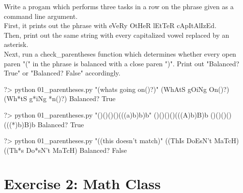 \documentclass{42-en}
\begin{document}
Write a progam which performs three tasks in a row on the phrase given as a command line argument.\\

First, it prints out the phrase with eVeRy OtHeR lEtTeR cApItAlIzEd.\\

Then, print out the same string with every capitalized vowel replaced by an asterisk.\\

Next, run a check\_parentheses function which determines whether every open paren "(" in the phrase is balanced with a close paren ")". Print out "Balanced? True" or "Balanced? False" accordingly.


\begin{42console}
	?> python 01_parentheses.py "(whats going on()?)"
	(WhAtS gOiNg On()?)
	(Wh*tS g*iNg *n()?)
	Balanced? True
\end{42console}

\begin{42console}
	?> python 01_parentheses.py "()()()()(((a)b)b)b"
	()()()()(((A)b)B)b
	()()()()(((*)b)B)b
	Balanced? True
\end{42console}

\begin{42console}
	?> python 01_parentheses.py "((this doesn't match)"
	((ThIs DoEsN't MaTcH)
	((Th*s Do*sN't MaTcH)
	Balanced? False
\end{42console}


\nextexercice
\newpage


\chapter{Exercise 2: Math Class}
\end{document}
